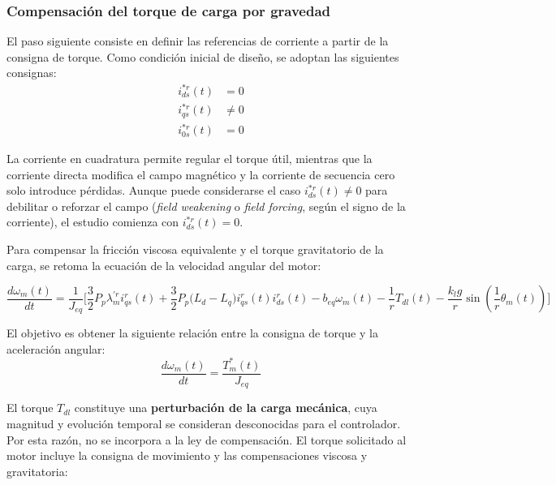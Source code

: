 \documentclass[blue,fullpaper]{ludusofficial}  %
\begin{document}
\subsubsection{Compensación del torque de carga por gravedad}

El paso siguiente consiste en definir las referencias de corriente a partir de la consigna de torque. Como condición inicial de diseño, se adoptan las siguientes consignas:
\begin{equation}
\label{eq:referencias-corriente}
\begin{aligned}
i_{ds}^{*r}(t) & = 0 \\
i_{qs}^{*r}(t) & \neq 0 \\
i_{0s}^{*r}(t) & = 0
\end{aligned}
\end{equation}

La corriente en cuadratura permite regular el torque útil, mientras que la corriente directa modifica el campo magnético y la corriente de secuencia cero solo introduce pérdidas. Aunque puede considerarse el caso $i_{ds}^{*r}(t) \neq 0$ para debilitar o reforzar el campo (\textit{field weakening} o \textit{field forcing}, según el signo de la corriente), el estudio comienza con $i_{ds}^{*r}(t) = 0$.

Para compensar la fricción viscosa equivalente y el torque gravitatorio de la carga, se retoma la ecuación de la velocidad angular del motor:

\begin{equation}
\label{eq:dinamica-mecanica-torque}
\frac{d\omega_{m}(t)}{dt} = \frac{1}{J_{eq}} \Bigg[ \frac{3}{2}P_{p} \lambda_{m}^{'r} i_{qs}^{r}(t) + \frac{3}{2} P_{p} \Big( L_{d} - L_{q} \Big) i_{qs}^{r}(t) i_{ds}^{r}(t) - b_{eq}  \omega_{m}(t)   - \frac{1}{r} T_{dl}(t) - \frac{k_{l}g}{r} \sin \left(  \frac{1}{r} \theta_{m}(t) \right) \Bigg]
\end{equation}

El objetivo es obtener la siguiente relación entre la consigna de torque y la aceleración angular:
\begin{equation}
\label{eq:objetivo-mecanico-ideal}
\frac{d\omega_{m}(t)}{dt} = \frac{T_{m}^{*}(t)}{J_{eq}} 
\end{equation}

El torque $T_{dl}$ constituye una \textbf{perturbación de la carga mecánica}, cuya magnitud y evolución temporal se consideran desconocidas para el controlador. Por esta razón, no se incorpora a la ley de compensación. El torque solicitado al motor incluye la consigna de movimiento y las compensaciones viscosa y gravitatoria:
\end{document}
